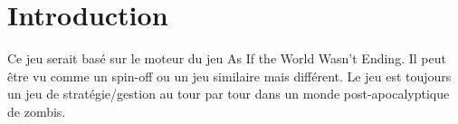 \section{Introduction}
Ce jeu serait basé sur le moteur du jeu As If the World Wasn't Ending. Il peut être vu comme un spin-off ou un jeu similaire mais différent. Le jeu est toujours un jeu de stratégie/gestion au tour par tour dans un monde post-apocalyptique de zombis.